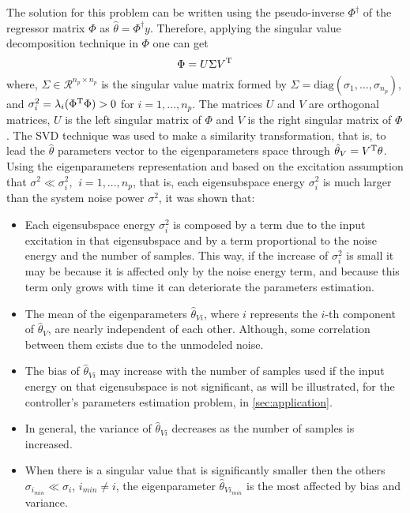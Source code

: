 The solution for this problem can be written using the pseudo-inverse $\Phi^\dagger $ of the regressor matrix $\Phi$ as
$	\hat{\theta} = \Phi^\dagger y $.
Therefore, applying the singular value decomposition technique in $\Phi$ one can get
\[
	\Phi = U \Sigma V^\text{T}
\]
where, $\Sigma \in \mathcal{R}^{n_p\times n_p}$  is the singular value matrix formed by $\Sigma = \text{diag}(\sigma_1, \dots, \sigma_{n_p})$, and $\sigma_i^2 = \lambda_i(\Phi^\text{T} \Phi) > 0$ for $i=1, \dots, n_p$.
The matrices $U$ and $V$ are orthogonal matrices, $U$ is the left singular matrix of $\Phi$ and $V$ is the right singular matrix of $\Phi$.
The SVD technique was used to make a similarity transformation, that is, to lead the $\hat{\theta}$ parameters vector to the eigenparameters space through $\hat{\theta}_V = V^\text{T} \theta$.
Using the eigenparameters representation and based on the excitation assumption that $\sigma^2 \ll \sigma_i^2, \,\ i = 1, \dots, n_p $, that is, each eigensubspace energy $\sigma_i^2$ is much larger than the system noise power $\sigma^2$, it was shown that:
\begin{itemize}
	\item Each eigensubspace energy $\sigma_i^2$ is composed by a term due to the input excitation in that eigensubspace and by a term proportional to the noise energy and the number of samples.
	This way, if the increase of $\sigma_i^2$ is small it may be because it is affected only by the noise energy term, and because this term only grows with time it can deteriorate the parameters estimation.
	\item The mean of the eigenparameters $\hat{\theta}_{Vi}$, where $i$ represents the $i$-th component of $\hat{\theta}_V$, are nearly independent of each other. Although, some correlation between them exists due to the unmodeled noise.
	\item The bias of $\hat{\theta}_{Vi}$ may increase with the number of samples used if the input energy on that eigensubspace is not significant, as will be illustrated, for the controller's parameters estimation problem, in \autoref{sec:application}.
	\item In general, the variance of $\hat{\theta}_{Vi}$ decreases as the number of samples is increased.
	\item When there is a singular value that is significantly smaller then the others $\sigma_{i_{min}} \ll \sigma_i$, $i_{min} \neq i$, the eigenparameter $\hat{\theta}_{Vi_{min}}$ is the most affected by bias and variance.
\end{itemize}

